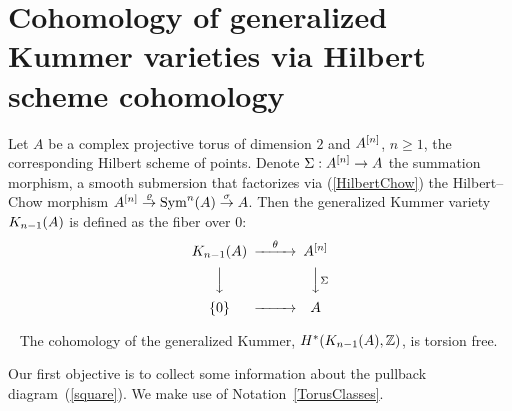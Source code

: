 \section[Generalized Kummer varieties and the morphism to the Hilbert scheme]{Cohomology of generalized Kummer varieties via Hilbert scheme cohomology %
}
\label{Section_GeneralKummer}
\begin{definition}
Let $A$ be a complex projective torus of dimension $2$ and $A\hilb{n}$, $n\geq 1$, the corresponding Hilbert scheme of points. Denote $\Sigma : A\hilb{n} \rightarrow A$ the summation morphism, a smooth submersion that factorizes via (\ref{HilbertChow}) the Hilbert--Chow morphism $A\hilb{n}\stackrel{\rho}{\rightarrow}\Sym^n(A)\stackrel{\sigma}{\rightarrow} A$. Then the generalized Kummer variety $\kum{A}{n-1}$ is defined as the fiber over $0$:
\begin{equation}\label{square}
\begin{CD}
\kum{A}{n-1} @>\theta >> A\hilb{n}\\
@VVV @VV\Sigma V\\
\{0\} @> >> A
\end{CD}
\end{equation}
\end{definition}
\begin{theorem}~\cite[Theorem 2]{Spanier}\label{torsion}
The cohomology of the generalized Kummer, $H^*(\kum{A}{n-1},\Z)$, is torsion free. 
\end{theorem}
Our first objective is to collect some information about the pullback diagram~(\ref{square}). 
We make use of Notation~\ref{TorusClasses}.

